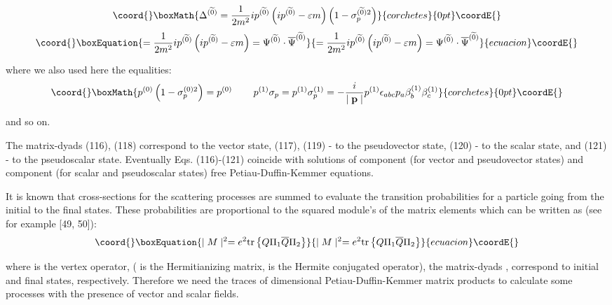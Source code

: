 \documentclass[a4paper,12pt]{article}
\begin{document}
\[\coord{}\boxMath{
\Delta ^{(\widetilde{0})}=\frac 1{2m^2}ip^{(\widetilde{0})}\left(
ip^{( \widetilde{0})}-\varepsilon m\right) \left( 1-\sigma
_p^{(\widetilde{0} )2}\right)
}{corchetes}{0pt}\coordE{}\]
\begin{equation}\coord{}\boxEquation{
=\frac 1{2m^2}ip^{(\widetilde{0})}\left( ip^{(\widetilde{0})}-\varepsilon
m\right) =\Psi ^{(\widetilde{0})}\cdot \overline{\Psi }^{(\widetilde{0})}
\label{121}
}{
=\frac 1{2m^2}ip^{(\widetilde{0})}\left( ip^{(\widetilde{0})}-\varepsilon
m\right) =\Psi ^{(\widetilde{0})}\cdot \overline{\Psi }^{(\widetilde{0})}
}{ecuacion}\coordE{}\end{equation}

where we also used here the equalities:
\[\coord{}\boxMath{
p^{(0)}\left( 1-\sigma _p^{(0)2}\right) =p^{(0)}\hspace{0.3in}p^{(1)}\sigma
_p=p^{(1)}\sigma _p^{(1)}=-\frac i{\mid \mathbf{p}\mid }p^{(1)}\epsilon
_{abc}p_a\beta _b^{(1)}\beta _c^{(1)}
}{corchetes}{0pt}\coordE{}\]

and so on.

The matrix-dyads (116), (118) correspond to the vector state,
(117), (119) - to the pseudovector state, (120) - to the scalar
state, and (121) - to the pseudoscalar state. Eventually Eqs.
(116)-(121) coincide with solutions of \coordHE{}component (for vector
and pseudovector states) and \coordHE{}component (for scalar and
pseudoscalar states) free Petiau-Duffin-Kemmer equations.

It is known that cross-sections for the scattering processes are summed to
evaluate the transition probabilities for a particle going from the initial
to the final states. These probabilities are proportional to the squared
module's of the matrix elements which can be written as (see for example
[49, 50]):
\begin{equation}\coord{}\boxEquation{
\mid M\mid ^2=e^2\mbox{tr}\left\{ Q\Pi _1\overline{Q}\Pi
_2\right\} \label{122}
}{
\mid M\mid ^2=e^2\mbox{tr}\left\{ Q\Pi _1\overline{Q}\Pi
_2\right\} }{ecuacion}\coordE{}\end{equation}

where \coordHE{} is the vertex operator, \coordHE{}
(\coordHE{} is the Hermitianizing
matrix, \coordHE{} is the Hermite conjugated operator), the
matrix-dyads \coordHE{}, \coordHE{} correspond to initial and final
states, respectively. Therefore we need the traces of \coordHE{}dimensional Petiau-Duffin-Kemmer matrix products to calculate
some processes with the presence of vector and scalar fields.
\end{document}
